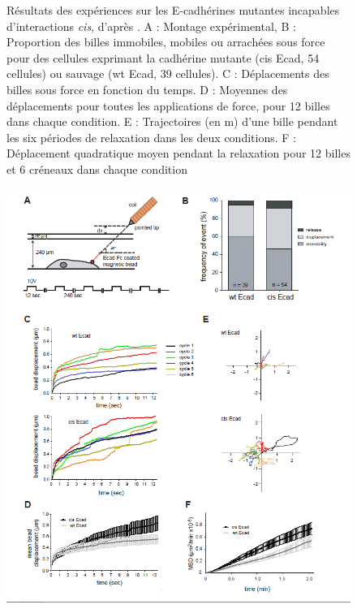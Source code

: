  \begin{figure}[h!]
\caption{\small Résultats des expériences sur les E-cadhérines mutantes incapables d'interactions \textit{cis}, d'après \cite{Strale}. A : Montage expérimental, B : Proportion des billes immobiles, mobiles ou arrachées sous force pour des cellules exprimant la cadhérine mutante (cis Ecad, 54 cellules) ou sauvage (wt Ecad, 39 cellules). C : Déplacements des billes sous force en fonction du temps. D : Moyennes des déplacements pour toutes les applications de force, pour 12 billes dans chaque condition. E : Trajectoires (en \micro m) d'une bille pendant les six périodes de relaxation dans les deux conditions. F : Déplacement quadratique moyen pendant la relaxation pour 12 billes et 6 créneaux dans chaque condition}
\end{figure} 
     
 \begin{figure}
 \includegraphics[scale=0.7]{Figures/Strale.png} 

 \end{figure}


 
 
 
 
%
